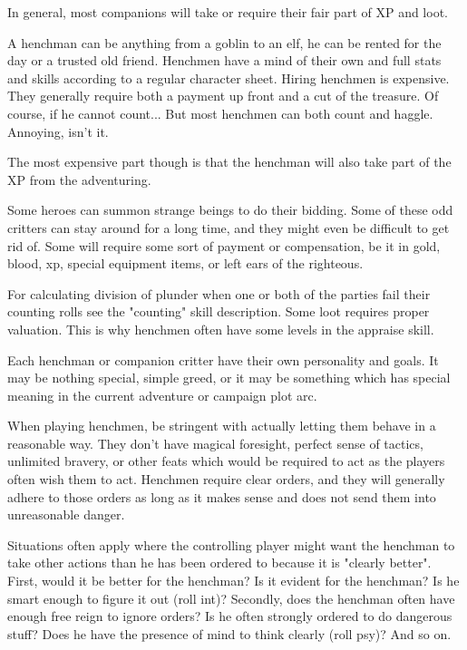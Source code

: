 In general, most companions will take or require their fair part of XP and loot.


\openitemslist

A henchman can be anything from a goblin to an elf, he can be rented for the day or a trusted old friend. Henchmen have a mind of their own and full stats and skills according to a regular character sheet.
Hiring henchmen is expensive. They generally require both a payment up front and a cut of the treasure. Of course, if he cannot count... But most henchmen can both count and haggle. Annoying, isn't it.

The most expensive part though is that the henchman will also take part of the XP from the adventuring.


Some heroes can summon strange beings to do their bidding. Some of these odd critters can stay around for a long time, and they might even be difficult to get rid of. Some will require some sort of payment or compensation, be it in gold, blood, xp, special equipment items, or left ears of the righteous.

\closeitemslist


For calculating division of plunder when one or both of the parties fail their counting rolls see the "counting" skill description. Some loot requires proper valuation. This is why henchmen often have some levels in the appraise skill.

Each henchman or companion critter have their own personality and goals. It may be nothing special, simple greed, or it may be something which has special meaning in the current adventure or campaign plot arc.

When playing henchmen, be stringent with actually letting them behave in a reasonable way. They don't have magical foresight, perfect sense of tactics, unlimited bravery, or other feats which would be required to act as the players often wish them to act. Henchmen require clear orders, and they will generally adhere to those orders as long as it makes sense and does not send them into unreasonable danger.

Situations often apply where the controlling player might want the henchman to take other actions than he has been ordered to because it is "clearly better". First, would it be better for the henchman? Is it evident for the henchman? Is he smart enough to figure it out (roll int)? Secondly, does the henchman often have enough free reign to ignore orders? Is he often strongly ordered to do dangerous stuff? Does he have the presence of mind to think clearly (roll psy)? And so on.

